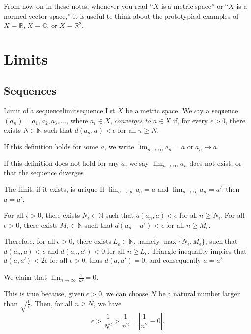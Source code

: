 From now on in these notes, whenever you read ``\(X\) is a metric space'' or ``\(X\) is a normed vector space,'' it is useful to think about the prototypical examples of \(X = \mathbb{R}\), \(X = \mathbb{C}\), or \(X = \mathbb{R}^2\). 

\chapter{Limits}

\section{Sequences}

\begin{defn}{Limit of a sequence}{limitsequence}
	Let \(X\) be a metric space.
	We say a sequence \((a_n) = a_1, a_2, a_3, \dots\), where \(a_i \in X\), \emph{converges to \(a \in X\)} if, for every \(\epsilon > 0\), there exists \(N \in \mathbb{N}\) such that \(d(a_n, a) < \epsilon\) for all \(n \geq N\).

	If this definition holds for some \(a\), we write \(\lim_{n\to\infty} a_n = a\) or \(a_n \to a\).

	If this definition does not hold for any \(a\), we say \(\lim_{n\to\infty} a_n\) does not exist, or that the sequence diverges.
\end{defn}

\begin{prop}{The limit, if it exists, is unique}{}
	If  \(\lim_{n\to\infty} a_n = a\) and  \(\lim_{n\to\infty} a_n = a'\), then \(a = a'\).
\end{prop}

\begin{dem}{}{}
	For all \(\epsilon > 0\), there exists \(N_\epsilon \in \mathbb{N}\) such that \( d(a_n, a) <\epsilon\) for all  \(n \geq N_\epsilon\).
	For all \(\epsilon > 0\), there exists \(M_\epsilon \in \mathbb{N}\) such that \( d(a_n - a') <\epsilon\) for all  \(n \geq M_\epsilon\).

	Therefore, for all \(\epsilon > 0\), there exists \(L_\epsilon \in \mathbb{N}\), namely \(\max\{N_\epsilon, M_\epsilon\}\), such that  \(d(a_n, a) < \epsilon\) and  \(d(a_n, a') < 0\) for all  \(n \geq L_\epsilon\). Triangle inequality implies that \(d(a, a') < 2\epsilon\) for all \(\epsilon > 0\); thus \(d(a, a') = 0\), and consequently \(a = a'\).
\end{dem}

\begin{exmp}{}{}
	We claim that \(\lim_{n\to\infty} \frac{1}{n^2} = 0\).

	This is true because, given \(\epsilon > 0\), we can choose \(N\) be a natural number larger than \(\sqrt{\frac{1}{\epsilon}}\). Then, for all \(n \geq N\), we have \[
		\epsilon > \frac{1}{N^2} > \frac{1}{n^2} = \left|\frac{1}{n^2} - 0\right|.
	\]
\end{exmp}

